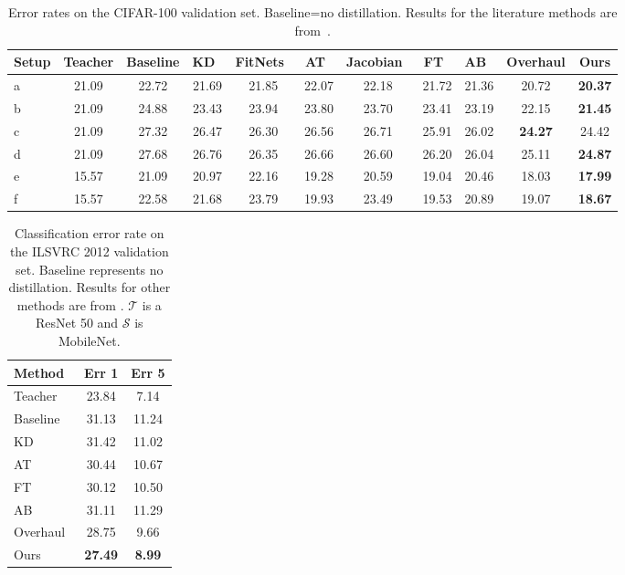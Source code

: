 \documentclass{article}
\begin{document}
\begin{table*}[t]
\begin{center}
\footnotesize 	
\begin{tabular}{|l|c|c|c|c|c|c|c|c|c|c|}
\hline
Setup &Teacher&Baseline & KD~\cite{hinton2015distilling} & FitNets~\cite{romero2014fitnets}& AT~\cite{zagoruyko2016paying} & Jacobian~\cite{srinivas2018knowledge} & FT~\cite{kim2018paraphrasing} & AB~\cite{heo2019knowledge} & Overhaul\cite{heo2019comprehensive} & Ours \\
\hline\hline
a & 21.09&22.72& 21.69 & 21.85 & 22.07 & 22.18 & 21.72 & 21.36 &20.72&  {\bf 20.37}\\ 
b & 21.09&24.88& 23.43 & 23.94 & 23.80 & 23.70 & 23.41 & 23.19 &22.15 &{\bf 21.45} \\
c & 21.09&27.32& 26.47 & 26.30 & 26.56 & 26.71 & 25.91 & 26.02 & {\bf 24.27} & 24.42 \\
d & 21.09&27.68& 26.76 & 26.35 & 26.66 & 26.60 & 26.20 & 26.04 &25.11 & {\bf 24.87} \\
e & 15.57&21.09& 20.97 & 22.16 & 19.28 & 20.59 & 19.04 & 20.46 &18.03 &  {\bf 17.99} \\
f & 15.57&22.58& 21.68 & 23.79 & 19.93 & 23.49 & 19.53 & 20.89 &19.07 & {\bf 18.67} \\
\hline
\end{tabular}
\end{center}
\caption{Error rates on the CIFAR-100 validation set. Baseline=no distillation. Results for the literature methods are from~\cite{heo2019comprehensive}.}
\label{tab:cifar100results}
\end{table*}
\begin{table}[t]
\begin{center}
\footnotesize 	
\begin{tabular}{|l|c|c|}
\hline 
Method& Err 1 & Err 5 \\
\hline\hline
Teacher & 23.84 & 7.14 \\
Baseline  & 31.13& 11.24 \\
KD~\cite{hinton2015distilling} & 31.42& 11.02 \\
AT~\cite{zagoruyko2016paying} & 30.44& 10.67\\
FT~\cite{kim2018paraphrasing} & 30.12 & 10.50\\
AB~\cite{heo2019knowledge} & 31.11 & 11.29 \\
Overhaul~\cite{heo2019comprehensive} &28.75 & 9.66 \\ 
Ours &  {\bf 27.49} & {\bf 8.99} \\
\hline
\end{tabular}
\end{center}
\caption{Classification error rate on the ILSVRC 2012 validation set. Baseline represents no distillation. Results for other methods are from \cite{heo2019comprehensive}. $\mathcal{T}$ is a ResNet 50 and $\mathcal{S}$ is MobileNet.}
\label{tab:imagenetresults}
\end{table}
\end{document}
